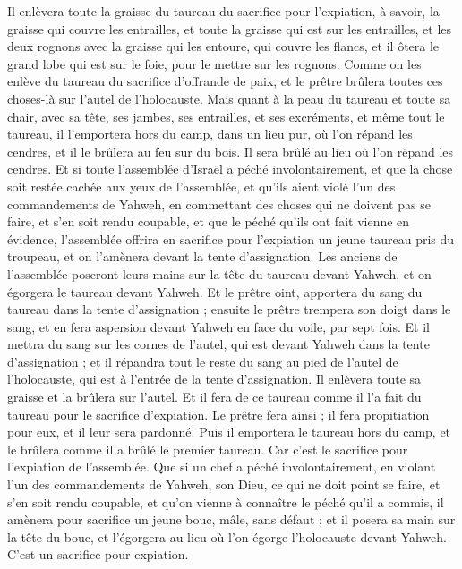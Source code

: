 \begin{multicols}{2}
Il enlèvera toute la graisse du taureau du sacrifice pour l'expiation, à savoir, la graisse qui couvre les entrailles, et toute la graisse qui est sur les entrailles,
et les deux rognons avec la graisse qui les entoure, qui couvre les flancs, et il ôtera le grand lobe qui est sur le foie, pour le mettre sur les rognons.
Comme on les enlève du taureau du sacrifice d'offrande de paix, et le prêtre brûlera toutes ces choses-là sur l'autel de l'holocauste.
Mais quant à la peau du taureau et toute sa chair, avec sa tête, ses jambes, ses entrailles, et ses excréments,
et même tout le taureau, il l'emportera hors du camp, dans un lieu pur, où l'on répand les cendres, et il le brûlera au feu sur du bois. Il sera brûlé au lieu où l'on répand les cendres.
Et si toute l'assemblée d'Israël a péché involontairement, et que la chose soit restée cachée aux yeux de l'assemblée, et qu'ils aient violé l'un des commandements de Yahweh, en commettant des choses qui ne doivent pas se faire, et s'en soit rendu coupable,
et que le péché qu'ils ont fait vienne en évidence, l'assemblée offrira en sacrifice pour l'expiation un jeune taureau pris du troupeau, et on l'amènera devant la tente d'assignation.
Les anciens de l'assemblée poseront leurs mains sur la tête du taureau devant Yahweh, et on égorgera le taureau devant Yahweh.
Et le prêtre oint, apportera du sang du taureau dans la tente d'assignation ;
ensuite le prêtre trempera son doigt dans le sang, et en fera aspersion devant Yahweh en face du voile, par sept fois.
Et il mettra du sang sur les cornes de l'autel, qui est devant Yahweh dans la tente d'assignation ; et il répandra tout le reste du sang au pied de l'autel de l'holocauste, qui est à l'entrée de la tente d'assignation.
Il enlèvera toute sa graisse et la brûlera sur l'autel.
Et il fera de ce taureau comme il l'a fait du taureau pour le sacrifice d'expiation. Le prêtre fera ainsi ; il fera propitiation pour eux, et il leur sera pardonné.
Puis il emportera le taureau hors du camp, et le brûlera comme il a brûlé le premier taureau. Car c'est le sacrifice pour l'expiation de l'assemblée.
Que si un chef a péché involontairement, en violant l'un des commandements de Yahweh, son Dieu, ce qui ne doit point se faire, et s'en soit rendu coupable,
et qu'on vienne à connaître le péché qu'il a commis, il amènera pour sacrifice un jeune bouc, mâle, sans défaut ;
et il posera sa main sur la tête du bouc, et l'égorgera au lieu où l'on égorge l'holocauste devant Yahweh. C'est un sacrifice pour expiation.

\end{multicols}
